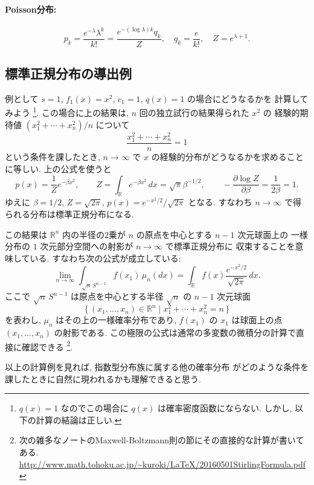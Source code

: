 \documentclass[12pt,twoside]{jarticle}
\newcommand\R{{\mathbb R}} %
\renewcommand\d{\partial}
\theoremstyle{jplain}
\theoremstyle{jplain}
\theoremstyle{jplain}
\numberwithin{theorem}{section}
\numberwithin{equation}{section}
\numberwithin{figure}{section}
\numberwithin{table}{section}
\begin{document}
\paragraph{Poisson分布:}
\[
p_k
= \frac{e^{-\lambda}\lambda^k}{k!}
=\frac{e^{-(\log\lambda)k}q_k}{Z},
\quad
q_k=\frac{e}{k!},
\quad
Z=e^{\lambda+1}.
\]


\subsection{標準正規分布の導出例}
\label{sec:normal-Gibbs}

例として $s=1$, $f_1(x)=x^2$, $c_1=1$, $q(x)=1$ の場合にどうなるかを
計算してみよう%
\footnote{$q(x)=1$ なのでこの場合に $q(x)$ は確率密度函数にならない.
しかし, 以下の計算の結論は正しい.}.
この場合に上の結果は, $n$ 回の独立試行の結果得られた $x^2$ の
経験的期待値 $(x_1^2+\cdots+x_n^2)/n$ について
\[
\frac{x_1^2+\cdots+x_n^2}{n}=1
\]
という条件を課したとき,
$n\to\infty$ で $x$ の経験的分布がどうなるかを求めることに等しい.
上の公式を使うと
\[
p(x)=\frac{1}{Z}e^{-\beta x^2}, \qquad
Z=\int_\R e^{-\beta x^2}\,dx=\sqrt{\pi}\beta^{-1/2}, \qquad
-\frac{\d\log Z}{\d\beta}=\frac{1}{2\beta}=1.
\]
ゆえに $\beta=1/2$, $Z=\sqrt{2\pi}$, $p(x)=e^{-x^2/2}/\sqrt{2\pi}$ となる.
すなわち $n\to\infty$ で得られる分布は標準正規分布になる.

この結果は $\R^n$ 内の半径の2乗が $n$ の原点を中心とする $n-1$ 次元球面上の
一様分布の $1$ 次元部分空間への射影が $n\to\infty$ で標準正規分布に
収束することを意味している. すなわち次の公式が成立している:
\[
\lim_{n\to\infty}\int_{\sqrt{n}\,S^{n-1}} f(x_1)\,\mu_n(dx)
=\int_\R f(x)\frac{e^{-x^2/2}}{\sqrt{2\pi}}\,dx.
\]
ここで $\sqrt{n}\,S^{n-1}$ は原点を中心とする半径 $\sqrt{n}$ の $n-1$ 次元球面
\[
\{\,(x_1,\ldots,x_n)\in\R^n\mid x_1^2+\cdots+x_n^2=n\,\}
\]
を表わし, $\mu_n$ はその上の一様確率分布であり,
$f(x_1)$ の $x_1$ は球面上の点 $(x_1,\ldots,x_n)$ の射影である.
この極限の公式は通常の多変数の微積分の計算で直接に確認できる%
\footnote{次の雑多なノートのMaxwell-Boltzmann則の節にその直接的な計算が書いてある. \\
\href{http://www.math.tohoku.ac.jp/~kuroki/LaTeX/20160501StirlingFormula.pdf}
{\ttfamily http://www.math.tohoku.ac.jp/{\textasciitilde}kuroki/LaTeX/20160501StirlingFormula.pdf}}.

以上の計算例を見れば, 指数型分布族に属する他の確率分布
がどのような条件を課したときに自然に現われるかも理解できると思う.

\end{document}
